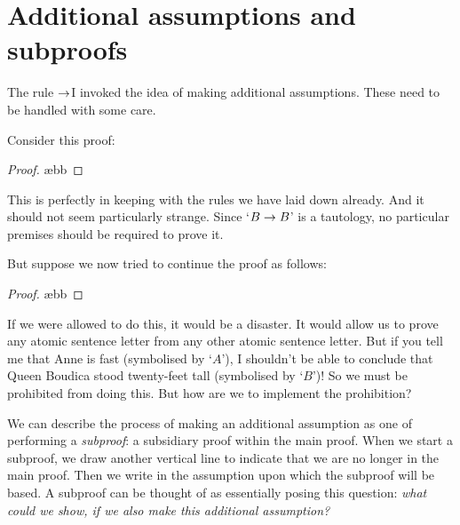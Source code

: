 \section{Additional assumptions and subproofs}
The rule $\rightarrow$I invoked the idea of making additional assumptions. These need to be handled with some care.

Consider this proof:
\begin{proof}
	\open
		 \ae{bb}
	\close
\end{proof}
This is perfectly in keeping with the rules we have laid down already. And it should not seem particularly strange. Since `$B \rightarrow B$' is a tautology, no particular premises should be required to prove it. 

But suppose we now tried to continue the proof as follows:
\begin{proof}
	\open
		 \ae{bb}
	\close
\end{proof}
If we were allowed to do this, it would be a disaster. It would allow us to prove any atomic sentence letter from any other atomic sentence letter. But if you tell me that Anne is fast (symbolised by `$A$'), I shouldn't be able to conclude that Queen Boudica stood twenty-feet tall (symbolised by `$B$')! So we must be prohibited from doing this. But how are we to implement the prohibition?

We can describe the process of making an additional assumption as one of performing a \emph{subproof}: a subsidiary proof within the main proof. When we start a subproof, we draw another vertical line to indicate that we are no longer in the main proof. Then we write in the assumption upon which the subproof will be based. A subproof can be thought of as essentially posing this question: \emph{what could we show, if we also make this additional assumption?}

